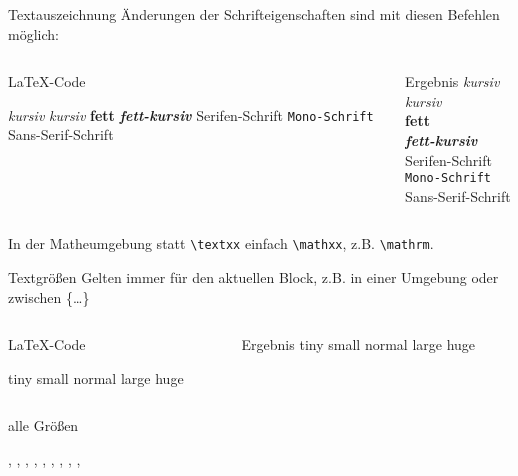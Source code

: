 \begin{frame}[fragile]{Textauszeichnung}
  Änderungen der Schrifteigenschaften sind mit diesen Befehlen möglich:
  \begin{columns}[t]
    \begin{column}{0.6\textwidth}
      \begin{block}{\LaTeX-Code}
        \begin{lstverbatim}
        \textit{kursiv} \emph{kursiv}
        \textbf{fett}
        \textbf{\textit{fett-kursiv}}
        \textrm{Serifen-Schrift}
        \texttt{Mono-Schrift}
        \textsf{Sans-Serif-Schrift}
        \end{lstverbatim}
      \end{block}
    \end{column}
    \begin{column}{0.35\textwidth}
      \begin{block}{Ergebnis}
        \textit{kursiv} \emph{kursiv} \\
        \textbf{fett} \\
        \textbf{\textit{fett-kursiv}} \\
        \textrm{Serifen-Schrift} \\
        \texttt{Mono-Schrift} \\
        \textsf{Sans-Serif-Schrift}
      \end{block}
    \end{column}
  \end{columns}
  \vspace{1em}
  In der Matheumgebung statt \verb+\textxx+ einfach \verb+\mathxx+, z.B. \verb+\mathrm+.
\end{frame}

\begin{frame}[fragile]{Textgrößen}
  Gelten immer für den aktuellen Block, z.B. in einer Umgebung oder zwischen \{\dots\}
  \begin{columns}[t]
    \begin{column}{0.47\textwidth}
      \begin{block}{\LaTeX-Code}
        \begin{lstverbatim}
        {\tiny tiny}
        {\small small}
        {\normalsize normal}
        {\large large}
        {\huge huge}
        \end{lstverbatim}
      \end{block}
    \end{column}
    \begin{column}{0.47\textwidth}
      \begin{block}{Ergebnis}
        {\tiny tiny}
        {\small small}
        {\normalsize normal}
        {\large large}
        {\huge huge}
      \end{block}
    \end{column}
  \end{columns}
  \vspace{1em}
  \begin{block}{alle Größen}
    \begin{lstverbatim}
    \tiny, \scriptsize, \footnotesize, \small, \normalsize, \large, \Large, \LARGE, \huge, \Huge
    \end{lstverbatim}
  \end{block}
\end{frame}

